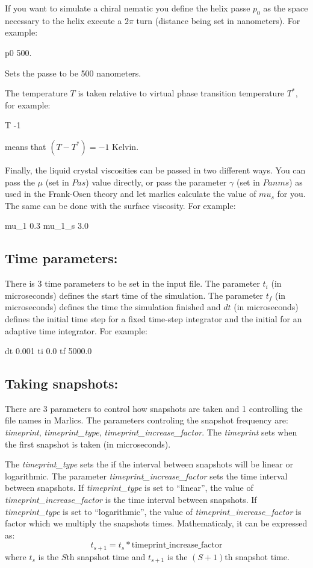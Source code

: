 \documentclass{article}
\begin{document}
If you want to simulate a chiral nematic you define the helix passe $p_0$ as the space necessary to the helix execute a $2 \pi$  turn (distance being set in nanometers). For example:

p0 500.

Sets the passe to be 500 nanometers.


The temperature $T$  is taken relative to virtual phase transition temperature $T^*$, for example:

T -1

means that $(T-T^*)=-1$ Kelvin.


Finally, the liquid crystal viscosities can be passed in two different ways. You can pass the $\mu$ (set in $Pa s$) value directly, or pass the parameter $\gamma$ (set in $Pa nm s$) as used in the Frank-Osen theory and let marlics calculate the value of $mu_s$ for you. The same can be done with the surface viscosity. For example:

mu_1      0.3          %
mu_1_s    3.0          %


\subsection{Time parameters:}

There is 3 time parameters to be set in the input file.  The parameter $t_i$ (in microseconds) defines the start time of the simulation. The parameter $t_f$ (in microseconds) defines the time the simulation finished and $dt$ (in microseconds) defines the initial time step for a fixed time-step integrator and the initial for an adaptive time integrator. For example:

dt        0.001     %
ti        0.0       %
tf        5000.0    %

\subsection{Taking snapshots:}


There are 3 parameters to control how snapshots are taken and 1 controlling the file names in Marlics. The parameters controling the snapshot frequency are: \textit{timeprint}, \textit{timeprint_type}, \textit{timeprint_increase_factor}. The \textit{timeprint} sets when the first snapshot is taken (in microseconds). 

The \textit{timeprint_type} sets the if the interval between snapshots will be linear or logarithmic. The parameter \textit{timeprint_increase_factor} sets the time interval between snapshots. If \textit{timeprint_type} is set to ``linear'', the value of \textit{timeprint_increase_factor} is the time interval between snapshots. If \textit{timeprint_type} is set to ``logarithmic'', the value of \textit{timeprint_increase_factor} is factor which we multiply the snapshots times. Mathematicaly, it can be expressed as:
\begin{equation}
  t_{s+1}=t_s *\textrm{timeprint_increase_factor}
\end{equation}
where $t_s$ is the $S$th snapshot time and $t_{s+1}$ is the $(S+1)$th snapshot time.
\end{document}
